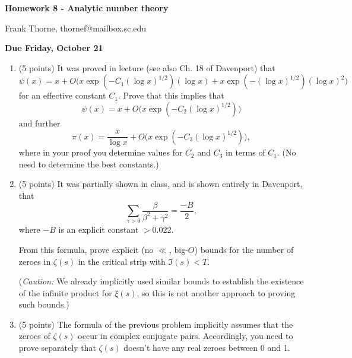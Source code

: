\documentclass[12pt]{article}
\begin{document}
\setlength{\topmargin}{-2mm}





\begin{center}{\bf Homework 8 - Analytic number theory}
\end{center}
\begin{center}Frank Thorne, thornef@mailbox.sc.edu
\end{center}
\begin{center}
{\bf Due Friday, October 21}
\end{center}
\begin{enumerate}
\item(5 points)
It was proved in lecture (see also Ch. 18 of Davenport) that
\begin{equation}
\psi(x) = x + O\bigg(x\exp(-C_1 (\log x)^{1/2} )(\log x) + x\exp(- (\log x)^{1/2})(\log x)^2\bigg)
\end{equation}
for an effective constant $C_1$. Prove that this implies that
\begin{equation}
\psi(x) = x + O\bigg(x\exp(-C_2(\log x)^{1/2} )\bigg)
\end{equation}
and further
\begin{equation}
\pi(x) = \frac{x}{\log x} + O\bigg(x\exp(-C_3(\log x)^{1/2}) \bigg),
\end{equation}
where in your proof you determine values for $C_2$ and $C_3$ in terms of $C_1$.
(No need to determine the best constants.)

\item(5 points)
It was partially shown in class, and is shown entirely in Davenport, that
$$\sum_{\gamma > 0} \frac{\beta}{\beta^2 + \gamma^2} = \frac{-B}{2},$$
where $-B$ is an explicit constant $> 0.022$.

From this formula, prove explicit (no $\ll$, big-$O$) bounds for the number of zeroes in $\zeta(s)$
in the critical strip with $\Im(s) < T$.

({\itshape Caution:} We already implicitly used similar bounds to establish the existence of the
infinite product for $\xi(s)$, so this is not another approach to proving such bounds.)

\item(5 points)
The formula of the previous problem implicitly assumes that the zeroes of $\zeta(s)$
occur in complex conjugate pairs. Accordingly, you need to prove separately that
$\zeta(s)$ doesn't have any real zeroes between 0 and 1.


\end{enumerate}
\end{document}
